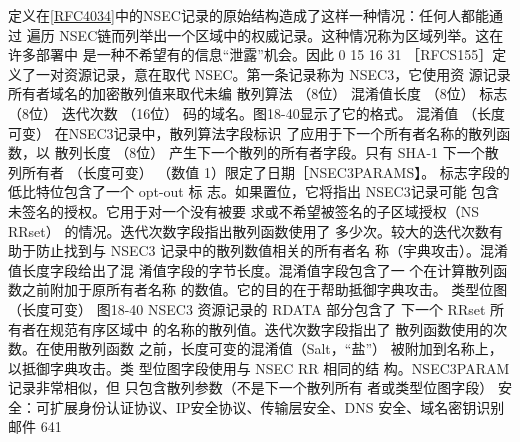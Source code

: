定义在\href{https://www.rfc-editor.org/rfc/rfc4034}{[RFC4034]}中的NSEC记录的原始结构造成了这样一种情况：任何人都能通过
遍历 NSEC链而列举出一个区域中的权威记录。这种情况称为区域列举。这在许多部署中
是一种不希望有的信息“泄露”机会。因此
0
15 16
31
［RFCS155］定义了一对资源记录，意在取代
NSEC。第一条记录称为 NSEC3，它使用资
源记录所有者域名的加密散列值来取代未编
散列算法
（8位）
混淆值长度
（8位）
标志
（8位）
迭代次数
（16位）
码的域名。图18-40显示了它的格式。
混淆值
（长度可变）
在NSEC3记录中，散列算法字段标识
了应用于下一个所有者名称的散列函数，以
散列长度
（8位）
产生下一个散列的所有者字段。只有 SHA-1
下一个散列所有者
（长度可变）
（数值 1）限定了日期［NSEC3PARAMS】。
标志字段的低比特位包含了一个 opt-out 标
志。如果置位，它将指出 NSEC3记录可能
包含未签名的授权。它用于对一个没有被要
求或不希望被签名的子区域授权（NS RRset）
的情况。迭代次数字段指出散列函数使用了
多少次。较大的迭代次数有助于防止找到与
NSEC3 记录中的散列数值相关的所有者名
称（宇典攻击）。混淆值长度字段给出了混
淆值字段的字节长度。混淆值字段包含了一
个在计算散列函数之前附加于原所有者名称
的数值。它的目的在于帮助抵御字典攻击。
类型位图
（长度可变）
图18-40
NSEC3 资源记录的 RDATA 部分包含了
下一个 RRset 所有者在规范有序区域中
的名称的散列值。迭代次数字段指出了
散列函数使用的次数。在使用散列函数
之前，长度可变的混淆值（Salt，“盐”）
被附加到名称上，以抵御字典攻击。类
型位图字段使用与 NSEC RR 相同的结
构。NSEC3PARAM 记录非常相似，但
只包含散列参数（不是下一个散列所有
者或类型位图字段）
安全：可扩展身份认证协议、IP安全协议、传输层安全、DNS 安全、域名密钥识别邮件 641


